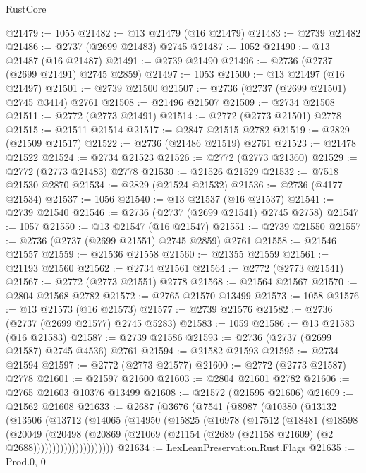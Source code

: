 \begin{lexlean}{RustCore}
\begin{coremodule}
@21479 := 1055
@21482 := @13 @21479 (@16 @21479)
@21483 := @2739 @21482
@21486 := @2737 (@2699 @21483) @2745
@21487 := 1052
@21490 := @13 @21487 (@16 @21487)
@21491 := @2739 @21490
@21496 := @2736 (@2737 (@2699 @21491) @2745 @2859)
@21497 := 1053
@21500 := @13 @21497 (@16 @21497)
@21501 := @2739 @21500
@21507 := @2736 (@2737 (@2699 @21501) @2745 @3414) @2761
@21508 := @21496 @21507
@21509 := @2734 @21508
@21511 := @2772 (@2773 @21491)
@21514 := @2772 (@2773 @21501) @2778
@21515 := @21511 @21514
@21517 := @2847 @21515 @2782
@21519 := @2829 (@21509 @21517)
@21522 := @2736 (@21486 @21519) @2761
@21523 := @21478 @21522
@21524 := @2734 @21523
@21526 := @2772 (@2773 @21360)
@21529 := @2772 (@2773 @21483) @2778
@21530 := @21526 @21529
@21532 := @7518 @21530 @2870
@21534 := @2829 (@21524 @21532)
@21536 := @2736 (@4177 @21534)
@21537 := 1056
@21540 := @13 @21537 (@16 @21537)
@21541 := @2739 @21540
@21546 := @2736 (@2737 (@2699 @21541) @2745 @2758)
@21547 := 1057
@21550 := @13 @21547 (@16 @21547)
@21551 := @2739 @21550
@21557 := @2736 (@2737 (@2699 @21551) @2745 @2859) @2761
@21558 := @21546 @21557
@21559 := @21536 @21558
@21560 := @21355 @21559
@21561 := @21193 @21560
@21562 := @2734 @21561
@21564 := @2772 (@2773 @21541)
@21567 := @2772 (@2773 @21551) @2778
@21568 := @21564 @21567
@21570 := @2804 @21568 @2782
@21572 := @2765 @21570 @13499
@21573 := 1058
@21576 := @13 @21573 (@16 @21573)
@21577 := @2739 @21576
@21582 := @2736 (@2737 (@2699 @21577) @2745 @5283)
@21583 := 1059
@21586 := @13 @21583 (@16 @21583)
@21587 := @2739 @21586
@21593 := @2736 (@2737 (@2699 @21587) @2745 @4536) @2761
@21594 := @21582 @21593
@21595 := @2734 @21594
@21597 := @2772 (@2773 @21577)
@21600 := @2772 (@2773 @21587) @2778
@21601 := @21597 @21600
@21603 := @2804 @21601 @2782
@21606 := @2765 @21603 @10376 @13499
@21608 := @21572 (@21595 @21606)
@21609 := @21562 @21608
@21633 := @2687
    (@3676
      (@7541
        (@8987
          (@10380
            (@13132
              (@13506
                (@13712
                  (@14065
                    (@14950
                      (@15825
                        (@16978
                          (@17512
                            (@18481
                              (@18598
                                (@20049
                                  (@20498
                                    (@20869
                                      (@21069
                                        (@21154
                                          (@2689 (@21158 @21609) (@2 @2688)))))))))))))))))))))
@21634 := LexLeanPreservation.Rust.Flags
@21635 := Prod.{0, 0}

\end{coremodule}
\end{lexlean}
